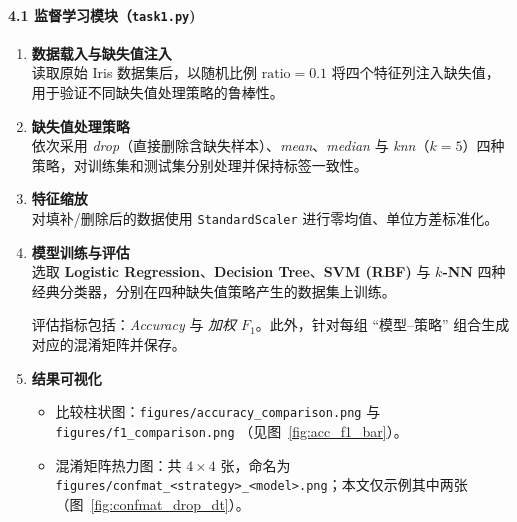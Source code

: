 \documentclass[UTF8]{ctexart}
\begin{document}
\paragraph{4.1 监督学习模块（\texttt{task1.py})}
\begin{enumerate}[label=\arabic*)]
    \item \textbf{数据载入与缺失值注入}\\
          读取原始 Iris 数据集后，以随机比例 \(\text{ratio}=0.1\) 将四个特征列注入缺失值，用于验证不同缺失值处理策略的鲁棒性。
    \item \textbf{缺失值处理策略}\\
          依次采用 \textit{drop}（直接删除含缺失样本）、\textit{mean}、\textit{median} 与 \textit{knn}（\(k=5\)）四种策略，对训练集和测试集分别处理并保持标签一致性。
    \item \textbf{特征缩放}\\
          对填补/删除后的数据使用 \texttt{StandardScaler} 进行零均值、单位方差标准化。
    \item \textbf{模型训练与评估}\\
          选取 \textbf{Logistic Regression}、\textbf{Decision Tree}、\textbf{SVM (RBF)} 与 \textbf{\(k\)-NN} 四种经典分类器，分别在四种缺失值策略产生的数据集上训练。\par
          评估指标包括：\emph{Accuracy} 与 \emph{加权 \(F_1\)}。此外，针对每组 ``模型–策略'' 组合生成对应的混淆矩阵并保存。
    \item \textbf{结果可视化}\\[-0.8em]
          \begin{itemize}
              \item 比较柱状图：\verb|figures/accuracy_comparison.png| 与 \verb|figures/f1_comparison.png| （见图~\ref{fig:acc_f1_bar}）。
              \item 混淆矩阵热力图：共 \(4 \times 4\) 张，命名为
                    \verb|figures/confmat_<strategy>_<model>.png|；本文仅示例其中两张（图~\ref{fig:confmat_drop_dt}）。
          \end{itemize}
\end{enumerate}
\end{document}
